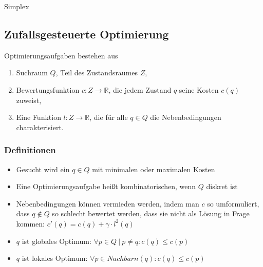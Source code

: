 \begin{algorithm}[H]
	\caption{Simplex}

	\BlankLine
	
\end{algorithm}


\subsection{Zufallsgesteuerte Optimierung}
Optimierungsaufgaben bestehen aus 
\begin{enumerate}
	\item Suchraum $Q$, Teil des Zustandsraumes $Z$,
	\item Bewertungsfunktion $c: Z \rightarrow \mathbb{R}$, die jedem Zustand $q$ seine Kosten $c(q)$ zuweist,
	\item Eine Funktion $l: Z \rightarrow \mathbb{R}$, die für alle $q \in Q$ die Nebenbedingungen charakterisiert.
\end{enumerate}

\subsubsection{Definitionen}
\begin{itemize}
	\item Gesucht wird ein \(q \in Q\) mit minimalen oder maximalen Kosten
	\item Eine Optimierungsaufgabe heißt kombinatorischen, wenn \(Q\) diskret ist
	\item Nebenbedingungen können vermieden werden, indem man \(c\) so umformuliert, dass \(q \not\in Q\) so schlecht bewertet werden, dass sie nicht als Lösung in Frage kommen: \(c'(q) = c(q) + \gamma \cdot l^2(q)\)
	\item \(q\) ist globales Optimum: \(\forall p \in Q~|~p \ne q: c(q) \le c(p)\)
	\item \(q\) ist lokales Optimum: \(\forall p \in Nachbarn(q): c(q) \le c(p)\)
\end{itemize}

